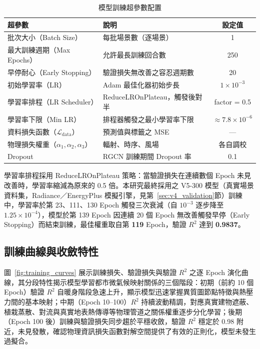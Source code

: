 \begin{table}[htbp]
    \centering
    \caption{模型訓練超參數配置}
    \label{tab:training_config}
    \small
    \begin{tabular}{llc}
        \toprule
        \textbf{超參數} & \textbf{說明} & \textbf{設定值} \\
        \midrule
        批次大小（Batch Size）         & 每批場景數（逐場景）            & 1 \\
        最大訓練週期（Max Epochs）     & 允許最長訓練回合數              & 250 \\
        早停耐心（Early Stopping）     & 驗證損失無改善之容忍週期數      & 20 \\
        初始學習率（LR）               & Adam 最佳化器初始步長             & $1 \times 10^{-3}$ \\
        學習率排程（LR Scheduler）     & ReduceLROnPlateau，觸發後對半   & factor = 0.5 \\
        學習率下限（Min LR）           & 排程器觸發之最小學習率下限      & $\approx 7.8 \times 10^{-6}$ \\
        資料損失函數（$\mathcal{L}_{\text{data}}$）& 預測值與標籤之 MSE  & --- \\
        物理損失權重（$\alpha_1, \alpha_2, \alpha_3$）& 輻射、時序、風場    & 各自調校 \\
        Dropout                        & RGCN 訓練期間 Dropout 率        & 0.1 \\
        \bottomrule
    \end{tabular}
\end{table}

學習率排程採用 ReduceLROnPlateau 策略：當驗證損失在連續數個 Epoch 未見改善時，學習率縮減為原來的 0.5 倍。本研究最終採用之 V5-300 模型（真實場景資料集，Radiance／EnergyPlus 模擬引擎，見第~\ref{sec:v4_validation}節）訓練中，學習率於第 23、111、130 Epoch 觸發三次衰減（自 $10^{-3}$ 逐步降至 $1.25 \times 10^{-4}$），模型於第 139 Epoch 因連續 20 個 Epoch 無改善觸發早停（Early Stopping）而結束訓練，最佳權重取自第 \textbf{119} Epoch，驗證 $R^2$ 達到 \textbf{0.9837}。

\subsection{訓練曲線與收斂特性}
\label{subsec:convergence}

圖~\ref{fig:training_curves} 展示訓練損失、驗證損失與驗證 $R^2$ 之逐 Epoch 演化曲線，其分段特性揭示模型學習都市微氣候映射關係的三個階段：初期（前約 10 個 Epoch）驗證 $R^2$ 自暖身階段急速上升，顯示模型迅速掌握異質圖節點特徵與熱壓力間的基本映射；中期（Epoch 10--100）$R^2$ 持續波動精調，對應真實建物遮蔽、植栽蒸散、對流與真實地表熱傳導等物理管道之關係權重逐步分化學習；後期（Epoch 100 後）訓練與驗證損失同步趨於平穩收斂，驗證 $R^2$ 穩定於 0.98 附近，未見發散，確認物理資訊損失函數對解空間提供了有效的正則化，模型未發生過擬合。

